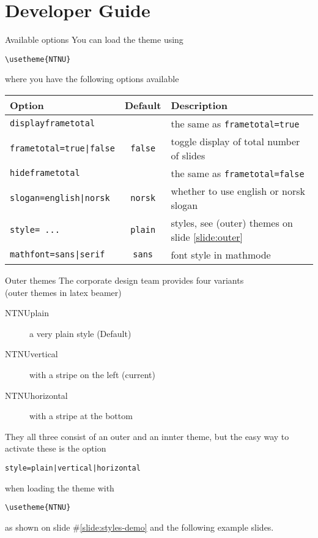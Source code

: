 \documentclass[aspectratio=169]{beamer}
\begin{document}
	\section{Developer Guide}
		\begin{frame}[fragile]{Available options}
			\label{slide:developer}
			You can load the theme using

			\lstinline!\usetheme{NTNU}!

			where you have the following options available

			\begin{tabular}{lcl}
				\toprule
				\textbf{Option} & \textbf{Default} &\textbf{Description} \\
				\midrule
				\lstinline!displayframetotal! && the same as \lstinline!frametotal=true! \\
				\lstinline!frametotal=true|false! & \lstinline!false! & toggle display of total number of slides\\
				\lstinline!hideframetotal! && the same as \lstinline!frametotal=false! \\
				\lstinline!slogan=english|norsk! & \lstinline!norsk! & whether to use english or norsk slogan\\
				\lstinline!style= ...! & \lstinline!plain! & styles, see (outer) themes on slide \ref{slide:outer}\\
				\lstinline!mathfont=sans|serif! & \lstinline!sans! & font style in mathmode\\
				\bottomrule
			\end{tabular}
		\end{frame}
		\begin{frame}[fragile]{Outer themes}
			\label{slide:outer}
			The corporate design team provides four variants
			\\\hfill{\small (outer themes in latex beamer)}

			\begin{description}
				\item[NTNUplain] a very plain style (Default)
				\item[NTNUvertical] with a stripe on the left (current)
				\item[NTNUhorizontal] with a stripe at the bottom
			\end{description}

			They all three consist of an outer and an innter theme, but the easy way to activate these is the option

			\lstinline!style=plain|vertical|horizontal!

			when loading the theme with

			\lstinline!\usetheme{NTNU}!

			as shown on slide \#\ref{slide:styles-demo} and the following example slides.
		\end{frame}
\end{document}
